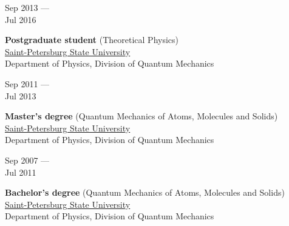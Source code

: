 \documentclass[10pt,a4paper]{article}
\newcommand{\lmpratio}{0.15}
\newcommand{\rmpratio}{0.74}
\newcommand{\horizontalSpace}{0.05\textwidth}
\newcommand{\sectionMain}[1]{\textbf{#1}}
\begin{document}
	\begin{minipage}[t]{\lmpratio\textwidth}
		Sep 2013 --- \\Jul 2016
	\end{minipage}
	\hspace{\horizontalSpace}
	\begin{minipage}[t]{\rmpratio\textwidth}
		\sectionMain{Postgraduate student} (Theoretical Physics)\\[0.1cm]		
		\href{http://english.spbu.ru/}{Saint-Petersburg State University}\\ Department of Physics, Division of Quantum Mechanics
	\end{minipage}

	\vspace{1cm}
	
	\begin{minipage}[t]{\lmpratio\textwidth}
		Sep 2011 --- \\Jul 2013
	\end{minipage}
	\hspace{\horizontalSpace}
	\begin{minipage}[t]{\rmpratio\textwidth}
		\sectionMain{Master's degree} (Quantum Mechanics of Atoms, Molecules and Solids) \\[0.1cm]
		\href{http://english.spbu.ru/}{Saint-Petersburg State University}\\ Department of Physics, Division of Quantum Mechanics
	\end{minipage}

	\vspace{1cm}
	
	\begin{minipage}[t]{\lmpratio\textwidth}
		Sep 2007 --- \\Jul 2011
	\end{minipage}
	\hspace{\horizontalSpace}
	\begin{minipage}[t]{\rmpratio\textwidth}
		\sectionMain{Bachelor's degree} (Quantum Mechanics of Atoms, Molecules and Solids) \\[0.1cm]
		\href{http://english.spbu.ru/}{Saint-Petersburg State University}\\ Department of Physics, Division of Quantum Mechanics
	\end{minipage}
	
\end{document}
